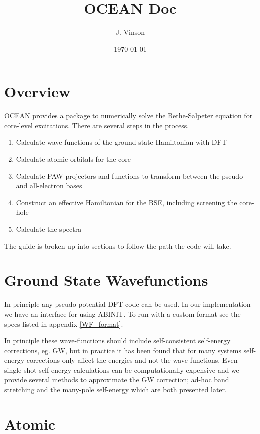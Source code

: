 \documentclass[12pt]{revtex4}
\begin{document}
\title{OCEAN Doc}

\author{J. Vinson}
\date{\today}

\maketitle

\section{Overview}

OCEAN provides a package to numerically solve the Bethe-Salpeter equation for core-level excitations. There are several steps in the process.
\begin{enumerate}
\item Calculate wave-functions of the ground state Hamiltonian with DFT
\item Calculate atomic orbitals for the core
\item Calculate PAW projectors and functions to transform between the pseudo and all-electron bases
\item Construct an effective Hamiltonian for the BSE, including screening the core-hole
\item Calculate the spectra
\end{enumerate}

The guide is broken up into sections to follow the path the code will take.

\section{Ground State Wavefunctions}
In principle any pseudo-potential DFT code can be used. In our implementation we have an interface for using ABINIT\cite{abinit}. To run with a custom format see the specs listed in appendix \ref{WF_format}.

In principle these wave-functions should include self-consistent self-energy corrections, eg. GW, but in practice it has been found that for many systems 
self-energy corrections only affect the energies and not the wave-functions. Even single-shot self-energy calculations can be computationally expensive 
and we provide several methods to approximate the GW correction; ad-hoc band stretching and the many-pole self-energy which are both presented 
later.


\section{Atomic}
\end{document}
